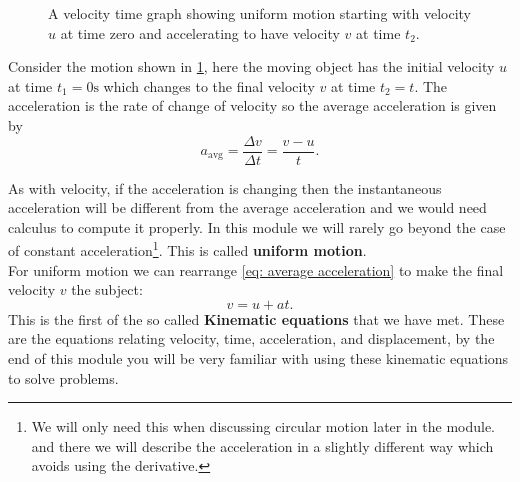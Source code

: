 \documentclass[a4paper,12pt]{book}
\begin{document}
\begin{figure}[ht]
    \centering
    \caption{A velocity time graph showing uniform motion starting with velocity $u$ at time zero and accelerating to have velocity $v$ at time $t_{2}$.}
    \label{fig: velocity time graph 1}
\end{figure}

Consider the motion shown in \cref{fig: velocity time graph 1}, here the moving object has the initial velocity $u$ at time $t_{1}=0\text{s}$ which changes to the final velocity $v$ at time $t_{2}=t$. The acceleration is the rate of change of velocity so the average acceleration is given by
\begin{equation}
    a_{\text{avg}}=\frac{\Delta v}{\Delta t}=\frac{v-u}{t}.
    \label{eq: average acceleration}
\end{equation}

As with velocity, if the acceleration is changing then the instantaneous acceleration will be different from the average acceleration and we would need calculus to compute it properly. In this module we will rarely go beyond the case of constant acceleration\footnote{We will only need this when discussing circular motion later in the module. and there we will describe the acceleration in a slightly different way which avoids using the derivative.}. This is called \textbf{uniform motion}.\\

For uniform motion we can rearrange \cref{eq: average acceleration} to make the final velocity $v$ the subject:
\begin{equation}
    v=u+at.
    \label{eq: Kinematic equation 1}
\end{equation}
This is the first of the so called \textbf{Kinematic equations} that we have met. These are the equations relating velocity, time, acceleration, and displacement, by the end of this module you will be very familiar with using these kinematic equations to solve problems. 
\end{document}
